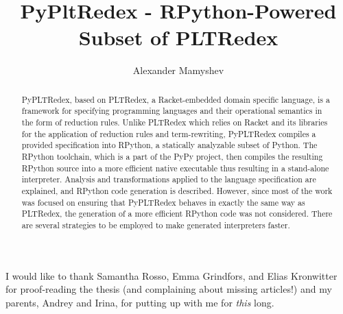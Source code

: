 \documentclass[mscthesis, 11pt]{usiinfthesis}
\title{PyPltRedex - RPython-Powered Subset of PLTRedex} %
\author{Alexander Mamyshev} %
\begin{document}
\maketitle %

\frontmatter %

\begin{abstract}
PyPLTRedex, based on PLTRedex, a Racket-embedded domain specific language, is a framework for specifying programming languages and their operational semantics in the form of reduction rules. Unlike PLTRedex which relies on Racket and its libraries for the application of reduction rules and term-rewriting, PyPLTRedex compiles a  provided specification into RPython, a statically analyzable subset of Python. The RPython toolchain, which is a part of the PyPy project, then compiles the resulting RPython source into a more efficient native executable thus resulting in a stand-alone interpreter. Analysis and transformations applied to the language specification are explained, and RPython code generation is described. However, since most of the work was focused on ensuring that PyPLTRedex behaves in exactly the same way as PLTRedex, the generation of a  more efficient RPython code was not considered. There are several strategies to be employed to make generated interpreters faster.
\end{abstract}


\begin{acknowledgements}
I would like to thank Samantha Rosso, Emma Grindfors, and Elias Kronwitter for proof-reading the thesis (and complaining about missing articles!) and my parents, Andrey and Irina, for putting up with me for \textit{this} long.
\end{acknowledgements}

\tableofcontents 

\mainmatter









%


\backmatter

%
%



\end{document}

